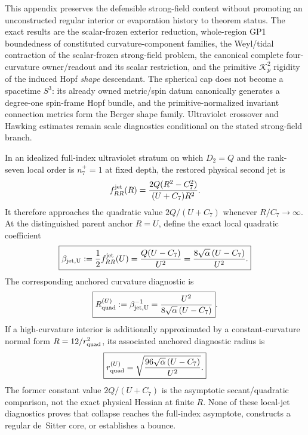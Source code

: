 \documentclass[12pt,a4paper]{article}
\begin{document}
This appendix preserves the defensible strong-field content without promoting
an unconstructed regular interior or evaporation history to theorem status.
The exact results are the scalar-frozen exterior reduction, whole-region GP1
boundedness of constituted curvature-component families, the Weyl/tidal
contraction of the scalar-frozen strong-field problem, the canonical complete
four-curvature owner/readout and its scalar restriction, and the primitive
\(\mathcal K_p^2\) rigidity of the induced Hopf \emph{shape} descendant.
The spherical cap does not become a spacetime \(S^3\): its already owned
metric/spin datum canonically generates a degree-one spin-frame Hopf bundle,
and the primitive-normalized invariant connection metrics form the Berger
shape family.  Ultraviolet crossover and Hawking estimates remain scale
diagnostics conditional on the stated strong-field branch.

\begin{proposition}
\label{p8:prop:uv-crossover-length-diagnostic}
In an idealized full-index ultraviolet stratum on which \(D_2=Q\) and the
rank-seven local order is \(n_7^+=1\) at fixed depth, the restored physical
second jet is
\[
 f_{RR}^{\rm jet}(R)
 =\frac{2Q(R^2-C_7^2)}{(U+C_7)R^2}.
\]
It therefore approaches the quadratic value \(2Q/(U+C_7)\) whenever
\(R/C_7\to\infty\).  At the distinguished parent anchor \(R=U\), define the
exact local quadratic coefficient
\[
 \boxed{\beta_{\rm jet,U}:=\frac12 f_{RR}^{\rm jet}(U)
 =\frac{Q(U-C_7)}{U^2}
 =\frac{8\sqrt\alpha\,(U-C_7)}{U^2}.}
\]
The corresponding anchored curvature diagnostic is
\begin{equation}
\label{p8:eq:uv-crossover-curvature}
 \boxed{R_{\rm quad}^{(U)}:=\beta_{\rm jet,U}^{-1}
 =\frac{U^2}{8\sqrt\alpha\,(U-C_7)}}.
\end{equation}
If a high-curvature interior is additionally approximated by a
constant-curvature normal form \(R=12/r_{\rm quad}^2\), its associated
anchored diagnostic radius is
\begin{equation}
\label{p8:eq:uv-crossover-radius}
 \boxed{r_{\rm quad}^{(U)}
 =\sqrt{\frac{96\sqrt\alpha\,(U-C_7)}{U^2}}.}
\end{equation}
The former constant value \(2Q/(U+C_7)\) is the asymptotic secant/quadratic
comparison, not the exact physical Hessian at finite \(R\).  None of these
local-jet diagnostics proves that collapse reaches the full-index asymptote,
constructs a regular de~Sitter core, or establishes a bounce.
\end{proposition}
\end{document}
